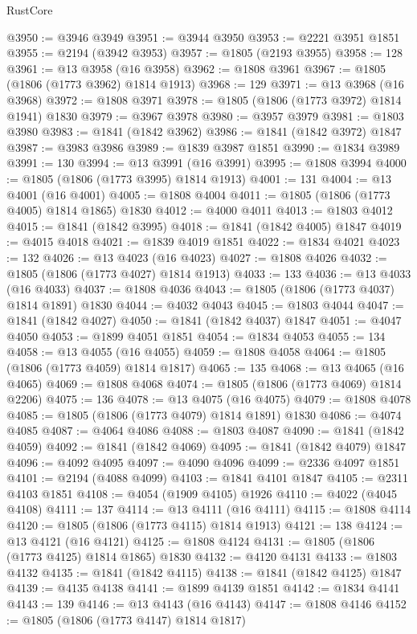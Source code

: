 \begin{lexlean}{RustCore}
\begin{coremodule}
@3950 := @3946 @3949
@3951 := @3944 @3950
@3953 := @2221 @3951 @1851
@3955 := @2194 (@3942 @3953)
@3957 := @1805 (@2193 @3955)
@3958 := 128
@3961 := @13 @3958 (@16 @3958)
@3962 := @1808 @3961
@3967 := @1805 (@1806 (@1773 @3962) @1814 @1913)
@3968 := 129
@3971 := @13 @3968 (@16 @3968)
@3972 := @1808 @3971
@3978 := @1805 (@1806 (@1773 @3972) @1814 @1941) @1830
@3979 := @3967 @3978
@3980 := @3957 @3979
@3981 := @1803 @3980
@3983 := @1841 (@1842 @3962)
@3986 := @1841 (@1842 @3972) @1847
@3987 := @3983 @3986
@3989 := @1839 @3987 @1851
@3990 := @1834 @3989
@3991 := 130
@3994 := @13 @3991 (@16 @3991)
@3995 := @1808 @3994
@4000 := @1805 (@1806 (@1773 @3995) @1814 @1913)
@4001 := 131
@4004 := @13 @4001 (@16 @4001)
@4005 := @1808 @4004
@4011 := @1805 (@1806 (@1773 @4005) @1814 @1865) @1830
@4012 := @4000 @4011
@4013 := @1803 @4012
@4015 := @1841 (@1842 @3995)
@4018 := @1841 (@1842 @4005) @1847
@4019 := @4015 @4018
@4021 := @1839 @4019 @1851
@4022 := @1834 @4021
@4023 := 132
@4026 := @13 @4023 (@16 @4023)
@4027 := @1808 @4026
@4032 := @1805 (@1806 (@1773 @4027) @1814 @1913)
@4033 := 133
@4036 := @13 @4033 (@16 @4033)
@4037 := @1808 @4036
@4043 := @1805 (@1806 (@1773 @4037) @1814 @1891) @1830
@4044 := @4032 @4043
@4045 := @1803 @4044
@4047 := @1841 (@1842 @4027)
@4050 := @1841 (@1842 @4037) @1847
@4051 := @4047 @4050
@4053 := @1899 @4051 @1851
@4054 := @1834 @4053
@4055 := 134
@4058 := @13 @4055 (@16 @4055)
@4059 := @1808 @4058
@4064 := @1805 (@1806 (@1773 @4059) @1814 @1817)
@4065 := 135
@4068 := @13 @4065 (@16 @4065)
@4069 := @1808 @4068
@4074 := @1805 (@1806 (@1773 @4069) @1814 @2206)
@4075 := 136
@4078 := @13 @4075 (@16 @4075)
@4079 := @1808 @4078
@4085 := @1805 (@1806 (@1773 @4079) @1814 @1891) @1830
@4086 := @4074 @4085
@4087 := @4064 @4086
@4088 := @1803 @4087
@4090 := @1841 (@1842 @4059)
@4092 := @1841 (@1842 @4069)
@4095 := @1841 (@1842 @4079) @1847
@4096 := @4092 @4095
@4097 := @4090 @4096
@4099 := @2336 @4097 @1851
@4101 := @2194 (@4088 @4099)
@4103 := @1841 @4101 @1847
@4105 := @2311 @4103 @1851
@4108 := @4054 (@1909 @4105) @1926
@4110 := @4022 (@4045 @4108)
@4111 := 137
@4114 := @13 @4111 (@16 @4111)
@4115 := @1808 @4114
@4120 := @1805 (@1806 (@1773 @4115) @1814 @1913)
@4121 := 138
@4124 := @13 @4121 (@16 @4121)
@4125 := @1808 @4124
@4131 := @1805 (@1806 (@1773 @4125) @1814 @1865) @1830
@4132 := @4120 @4131
@4133 := @1803 @4132
@4135 := @1841 (@1842 @4115)
@4138 := @1841 (@1842 @4125) @1847
@4139 := @4135 @4138
@4141 := @1899 @4139 @1851
@4142 := @1834 @4141
@4143 := 139
@4146 := @13 @4143 (@16 @4143)
@4147 := @1808 @4146
@4152 := @1805 (@1806 (@1773 @4147) @1814 @1817)

\end{coremodule}
\end{lexlean}
